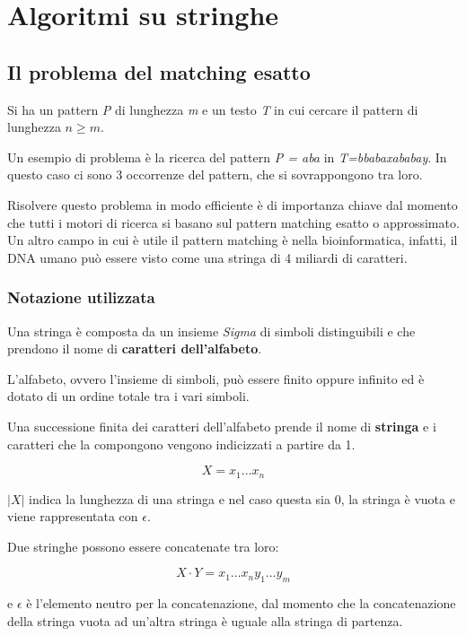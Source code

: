 \chapter{Algoritmi su stringhe}\label{algoritmi-su-stringhe}

\section{Il problema del matching esatto}\label{il-problema-del-matching-esatto}

Si ha un pattern \emph{P} di lunghezza \emph{m} e un testo \emph{T} in
cui cercare il pattern di lunghezza $n \geq m$.

Un esempio di problema è la ricerca del pattern \emph{P = aba} in
\emph{T=bbabaxababay}. In questo caso ci sono 3 occorrenze del pattern,
che si sovrappongono tra loro.

Risolvere questo problema in modo efficiente è di importanza chiave dal
momento che tutti i motori di ricerca si basano sul pattern matching
esatto o approssimato. Un altro campo in cui è utile il pattern matching
è nella bioinformatica, infatti, il DNA umano può essere visto come una
stringa di 4 miliardi di caratteri.

\subsection{Notazione utilizzata}\label{notazione-utilizzata}

Una stringa è composta da un insieme \emph{Sigma} di simboli
distinguibili e che prendono il nome di \textbf{caratteri dell'alfabeto}.

L'alfabeto, ovvero l'insieme di simboli, può essere finito oppure
infinito ed è dotato di un ordine totale tra i vari simboli.

Una successione finita dei caratteri dell'alfabeto prende il nome di
\textbf{stringa} e i caratteri che la compongono vengono indicizzati a
partire da 1.

$$
X = x_1 \ldots x_n
$$

$|X|$ indica la lunghezza di una stringa e nel
caso questa sia 0, la stringa è vuota e viene rappresentata con
$\epsilon$.

Due stringhe possono essere concatenate tra loro:

$$
X \cdot Y = x_1\ldots x_ny_1\ldots y_m
$$

e $\epsilon$ è l'elemento neutro per la concatenazione, dal momento
che la concatenazione della stringa vuota ad un'altra stringa è uguale
alla stringa di partenza.

